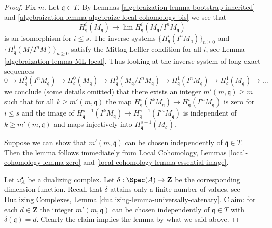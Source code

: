 \begin{proof}

Fix $m$. Let $\mathfrak q \in T$.
By Lemmas \ref{algebraization-lemma-bootstrap-inherited} and
\ref{algebraization-lemma-algebraize-local-cohomology-bis}
we see that
$$
H^i_\mathfrak q(M_\mathfrak q)
\longrightarrow
\lim H^i_\mathfrak q(M_\mathfrak q/I^nM_\mathfrak q)
$$
is an isomorphism for $i \leq s$. The inverse systems
$\{H^i_\mathfrak q(I^nM_\mathfrak q)\}_{n \geq 0}$ and
$\{H^i_\mathfrak q(M/I^nM)\}_{n \geq 0}$
satisfy the Mittag-Leffler condition for all $i$, see
Lemma \ref{algebraization-lemma-ML-local}. Thus looking at the inverse system of
long exact sequences
$$
0 \to H^0_\mathfrak q(I^nM_\mathfrak q) \to
H^0_\mathfrak q(M_\mathfrak q) \to
H^0_\mathfrak q(M_\mathfrak q/I^nM_\mathfrak q) \to
H^1_\mathfrak q(I^nM_\mathfrak q) \to
H^1_\mathfrak q(M_\mathfrak q) \to \ldots
$$
we conclude (some details omitted) that there exists an integer
$m'(m, \mathfrak q) \geq m$ such that for all $k \geq m'(m, \mathfrak q)$
the map
$H^i_\mathfrak q(I^kM_\mathfrak q) \to H^i_\mathfrak q(I^mM_\mathfrak q)$
is zero for $i \leq s$ and the image of
$H^{s + 1}_\mathfrak q(I^kM_\mathfrak q) \to
H^{s + 1}_\mathfrak q(I^mM_\mathfrak q)$
is independent of $k \geq m'(m, \mathfrak q)$ and
maps injectively into $H^{s + 1}_\mathfrak q(M_\mathfrak q)$.

\medskip\noindent
Suppose we can show that $m'(m, \mathfrak q)$ can be chosen
independently of $\mathfrak q \in T$.
Then the lemma follows immediately from
Local Cohomology, Lemmas \ref{local-cohomology-lemma-zero} and
\ref{local-cohomology-lemma-essential-image}.

\medskip\noindent
Let $\omega_A^\bullet$ be a dualizing complex. Let
$\delta : \Spec(A) \to \mathbf{Z}$ be the corresponding
dimension function. Recall that $\delta$ attains only a
finite number of values, see
Dualizing Complexes, Lemma \ref{dualizing-lemma-universally-catenary}.
Claim: for each $d \in \mathbf{Z}$ the integer
$m'(m, \mathfrak q)$ can be chosen independently
of $\mathfrak q \in T$ with $\delta(\mathfrak q) = d$.
Clearly the claim implies the lemma by what we said above.


\end{proof}
